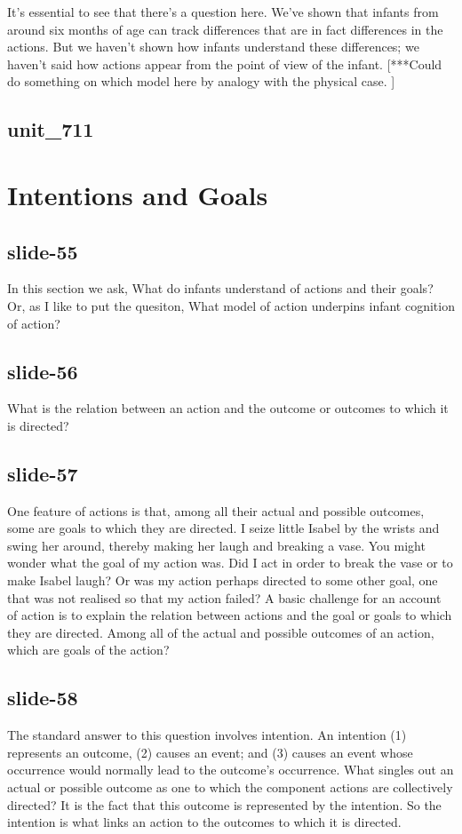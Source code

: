 \documentclass[12pt,\papersize]{extarticle}
\begin{document}
It's essential to see that there's a question here.
We've shown that infants from around six months of age can track differences that are in fact differences in the actions.
But we haven't shown how infants understand these differences; we haven't said how actions appear from the point of view of the infant.
[***Could do something on which model here by analogy with the physical case. ]
 
 
\subsection{unit\_711}
 
\section{Intentions and Goals}
 
 
\subsection{slide-55}
In this section we ask, What do infants understand of actions and their goals?
Or, as I like to put the quesiton, What model of action underpins infant cognition of action?
 
 
\subsection{slide-56}
What is the relation between an action and the outcome or outcomes to which it is directed?
 
 
\subsection{slide-57}
One feature of actions is that, among all their actual and possible outcomes, some are goals to which they are directed.
I seize little Isabel by the wrists and swing her around, thereby making her laugh and breaking a vase.
You might wonder what the goal of my action was.
Did I act in order to break the vase or to make Isabel laugh?
Or was my action perhaps directed to some other goal, one that was not realised so that my action failed?
A basic challenge for an account of action is to explain the relation between actions and the goal or goals to which they are directed.
Among all of the actual and possible outcomes of an action, which are goals of the action?
 
 
\subsection{slide-58}
The standard answer to this question involves intention.
An intention (1) represents an outcome, (2) causes an event; and (3) causes an event whose occurrence would normally lead to the outcome’s occurrence.
What singles out an actual or possible outcome as one to which the component actions are collectively directed? It is the fact that this outcome is represented by the intention.
So the intention is what links an action to the outcomes to which it is directed.
 
\end{document}

